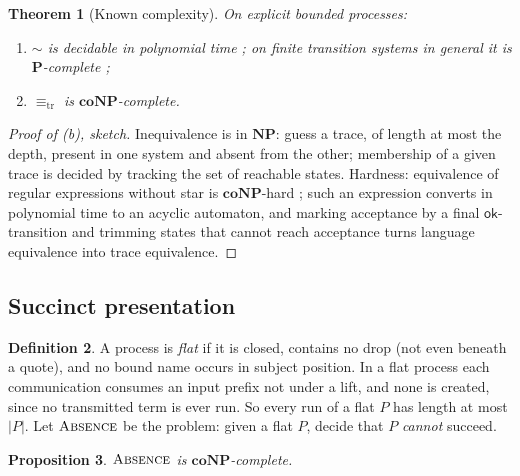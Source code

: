 \documentclass[11pt]{article}
\theoremstyle{definition}
\newtheorem{definition}{Definition}[section]
\theoremstyle{plain}
\newtheorem{proposition}[definition]{Proposition}
\newtheorem{theorem}[definition]{Theorem}
\theoremstyle{remark}
\newcommand{\sbisim}{\sim}
\newcommand{\treq}{\equiv_{\mathrm{tr}}}
\newcommand{\ok}{\mathsf{ok}}
\newcommand{\ABS}{\textup{\textsc{Absence}}}
\newcommand{\Pclass}{\mathbf{P}}
\newcommand{\NPclass}{\mathbf{NP}}
\newcommand{\coNP}{\mathbf{coNP}}
\begin{document}
\begin{theorem}[Known complexity]\label{thm:known}
On explicit bounded processes:
\begin{enumerate}[label=(\alph*),leftmargin=2.2em,nosep]
\item $\sbisim$ is decidable in polynomial time \cite{PaigeTarjan87};
on finite transition systems in general it is $\Pclass$-complete
\cite{BGS92};
\item $\treq$ is $\coNP$-complete.
\end{enumerate}
\end{theorem}

\begin{proof}[Proof of (b), sketch]
Inequivalence is in $\NPclass$: guess a trace, of length at most the
depth, present in one system and absent from the other; membership of a
given trace is decided by tracking the set of reachable states.
Hardness: equivalence of regular expressions without star is
$\coNP$-hard \cite{StockmeyerMeyer73}; such an expression converts in
polynomial time to an acyclic automaton, and marking acceptance by a
final $\ok$-transition and trimming states that cannot reach acceptance
turns language equivalence into trace equivalence.
\end{proof}

\subsection{Succinct presentation}

\begin{definition}\label{def:flat}
A process is \emph{flat} if it is closed, contains no drop (not even beneath a quote), and no bound
name occurs in subject position. In a flat process each communication consumes an input
prefix not under a lift, and none is created, since no transmitted term is
ever run. So every run of a flat $P$ has length at most $|P|$. Let
$\ABS$ be the problem: given a flat $P$, decide that $P$ \emph{cannot}
succeed.
\end{definition}

\begin{proposition}\label{prop:abscomplete}
$\ABS$ is $\coNP$-complete.
\end{proposition}
\end{document}
